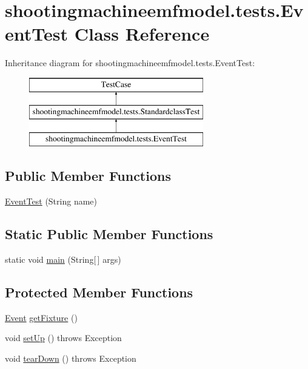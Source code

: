 \hypertarget{classshootingmachineemfmodel_1_1tests_1_1_event_test}{\section{shootingmachineemfmodel.\-tests.\-Event\-Test Class Reference}
\label{classshootingmachineemfmodel_1_1tests_1_1_event_test}
}
Inheritance diagram for shootingmachineemfmodel.\-tests.\-Event\-Test\-:\begin{figure}[H]
\begin{center}
\leavevmode
\includegraphics[height=3.000000cm]{classshootingmachineemfmodel_1_1tests_1_1_event_test}
\end{center}
\end{figure}
\subsection*{Public Member Functions}
\begin{DoxyCompactItemize}
\item 
\hyperlink{classshootingmachineemfmodel_1_1tests_1_1_event_test_a7cdf7542f6867c33bc24351aeba166fb}{Event\-Test} (String name)
\end{DoxyCompactItemize}
\subsection*{Static Public Member Functions}
\begin{DoxyCompactItemize}
\item 
static void \hyperlink{classshootingmachineemfmodel_1_1tests_1_1_event_test_acd2730f26a261c37222effff3aa720c0}{main} (String\mbox{[}$\,$\mbox{]} args)
\end{DoxyCompactItemize}
\subsection*{Protected Member Functions}
\begin{DoxyCompactItemize}
\item 
\hyperlink{interfaceshootingmachineemfmodel_1_1_event}{Event} \hyperlink{classshootingmachineemfmodel_1_1tests_1_1_event_test_a758c9755322b7f66547ad7edb4cb84db}{get\-Fixture} ()
\item 
void \hyperlink{classshootingmachineemfmodel_1_1tests_1_1_event_test_af3643c6d0385e03459e52d2f171ce753}{set\-Up} ()  throws Exception 
\item 
void \hyperlink{classshootingmachineemfmodel_1_1tests_1_1_event_test_afaf7fbe75e13cd9b20b2a4a24ab3dd67}{tear\-Down} ()  throws Exception 
\end{DoxyCompactItemize}
